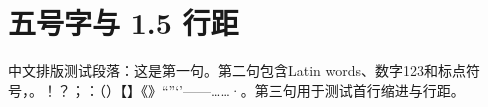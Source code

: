 \documentclass[a4paper,10pt,UTF8,scheme=chinese,zihao=5]{ctexart}
\begin{document}
\section{五号字与 1.5 行距}
中文排版测试段落：这是第一句。第二句包含Latin words、数字123和标点符号，。！？；：（）【】《》“”‘’——……·。第三句用于测试首行缩进与行距。
\end{document}
